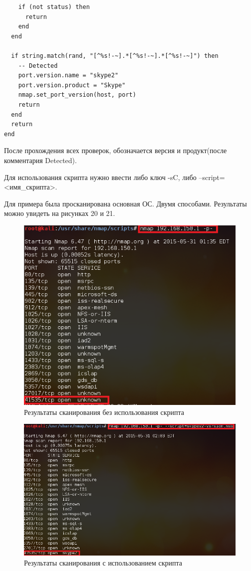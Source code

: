 \documentclass[11pt, a4paper]{article}		%
\begin{document}
\begin{itemize}
\begin{verbatim}
    if (not status) then
      return
    end
  end

  if string.match(rand, "[^%s!-~].*[^%s!-~].*[^%s!-~]") then
    -- Detected
    port.version.name = "skype2"
    port.version.product = "Skype"
    nmap.set_port_version(host, port)
    return
  end
  return
end
\end{verbatim}

После прохождения всех проверок, обозначается версия и продукт(после комментария Detected).

Для использования скрипта нужно ввести либо ключ -sC, либо --script=<имя\_скрипта>.

Для примера была просканирована основная ОС. Двумя способами. Результаты можно увидеть на рисунках 20 и 21.

\begin{figure}[h!]
\centering
\includegraphics[scale=0.8]{res/script_1}
\caption{Результаты сканирования без использования скрипта}
\end{figure}

\begin{figure}[h!]
\centering
\includegraphics[scale=0.8]{res/script_2}
\caption{Результаты сканирования с использованием скрипта}
\end{figure}

\end{itemize}
\end{document}
